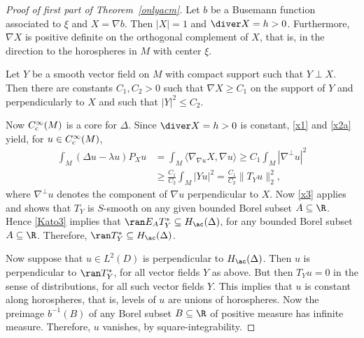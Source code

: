 \begin{proof}[Proof of first part of Theorem~\ref{onlyacm}]
Let $b$ be a Busemann function associated to $\xi$ and ${X=\nabla b}$.
Then $|X|=1$ and $\diver X=h>0$.
Furthermore, $\nabla X$ is positive definite on the orthogonal complement of $X$,
that is, in the direction to the horospheres in $M$ with center $\xi$.

Let $Y$ be a smooth vector field on $M$ with compact support such that $Y\perp X$.
Then there are constants $C_1,C_2>0$ such that $\nabla X\ge C_1$ on the support of $Y$ and perpendicularly to $X$
and such that $|Y|^2\le C_2$.

Now $C^\infty_{\rm c}(M)$ is a core for $\Delta$.
Since $\diver X=h>0$ is constant, \eqref{x1} and \eqref{x2a} yield, for $u\in C^\infty_{\rm c}(M)$,
\begin{align*}
 \int_M (\Delta u-\lambda u) P_Xu
 &= \int_M \langle\nabla_{\nabla u}X,\nabla u\rangle \ge C_1 \int_M|\nabla^\bot u|^2 \\
 &\ge \frac{C_1}{C_2}\int_M|Yu|^2 = \frac{C_1}{C_2}\|T_Yu\|_2^2,
\end{align*}
where $\nabla^\bot u$ denotes the component of $\nabla u$ perpendicular to $X$.
Now \eqref{x3} applies and shows that $T_Y$ is $S$-smooth on any given bounded Borel subset $A\subseteq\R$.
Hence \eqref{Kato3} implies that $\ran E_AT_Y^*\subseteq H_{\ac}(\Delta)$,
for any bounded Borel subset $A\subseteq\R$.
Therefore, $\ran T_Y^*\subseteq H_{\ac}(\Delta)$.

Now suppose that $u\in L^2(D )$ is perpendicular to $H_{\ac}(\Delta)$.
Then $u$ is perpendicular to $\ran T_Y^*$, for all vector fields $Y$ as above.
But then $T_Yu=0$ in the sense of distributions, for all such vector fields $Y$.
This implies that $u$ is constant along horospheres, that is, levels of $u$ are unions of horospheres.
Now the preimage $b^{-1}(B)$ of any Borel subset $B\subseteq\R$ of positive measure has infinite measure.
Therefore, $u$ vanishes, by square-integrability.
\end{proof}


